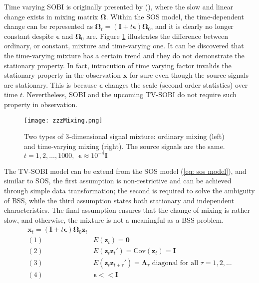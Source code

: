 \documentclass[utf8,english]{gradu3}
\begin{document}
Time varying SOBI is originally presented by \citeauthor{yeredor2003tv} (\citeyear{yeredor2003tv}), where the slow and linear change exists in mixing matrix $\boldsymbol{\Omega}$. Within the SOS model, the time-dependent change can be represented as $\boldsymbol\Omega_t = (\boldsymbol I + t \boldsymbol\epsilon)\boldsymbol\Omega_0$, and it is clearly no longer constant despite $\boldsymbol\epsilon$ and $\boldsymbol\Omega_0$ are. Figure \ref{fig: mixing} illustrates the difference between ordinary, or constant, mixture and time-varying one. It can be discovered that the time-varying mixture has a certain trend and they do not demonstrate the stationary property. In fact, introcution of time varying factor invalids the stationary property in the observation $\boldsymbol{x}$ for sure even though the source signals are stationary. This is because $\boldsymbol{\epsilon}$ changes the scale (second order statistics) over time $t$. Nevertheless, SOBI and the upcoming TV-SOBI do not require such property in observation.

\begin{figure}
  \texttt{[image: zzzMixing.png]}
  \caption{Two types of 3-dimensional signal mixture: ordinary mixing (left) and time-varying mixing (right). The source signals are the same. $t=1,2,\dots, 1000,\ \ \boldsymbol \epsilon\approx 10^{-4}\boldsymbol{I} $}
  \label{fig: mixing}
\end{figure}

The TV-SOBI model can be extend from the SOS model (\ref{eq: sos model}), and similar to SOS, the first assumption is non-restrictive and can be achieved through simple data transformation; the second is required to solve the ambiguity of BSS, while the third assumption states both stationary and independent characteristics. The final assumption ensures that the change of mixing is rather slow, and otherwise, the mixture is not a meaningful as a BSS problem.
\begin{equation}
    \label{eq: tvsobi model}
    \begin{aligned} 
\boldsymbol x_t =  ( \boldsymbol I + t \boldsymbol{\epsilon})\boldsymbol \Omega_0 \boldsymbol  z_t
\\ (1)\ & E( \boldsymbol z_t) = \boldsymbol 0 
\\ (2)\ & E( \boldsymbol z_t \boldsymbol z_t') = \text{Cov}( \boldsymbol z_t) = \boldsymbol I
\\ (3)\ & E( \boldsymbol z_t \boldsymbol z_{t+\tau}') = \boldsymbol\Lambda_\tau \text{ diagonal for all }
\tau = 1,2,\dots
\\ (4)\ & \boldsymbol{\epsilon} << \boldsymbol I
\end{aligned}
\end{equation}
\end{document}
